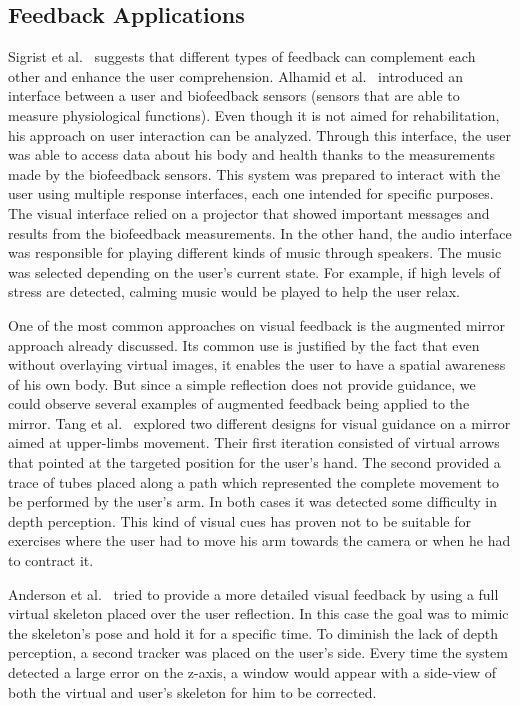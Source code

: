 \subsection{Feedback Applications}



Sigrist et al.~\cite{Sigrist2013} suggests that different types of feedback can complement each other and enhance the user comprehension. 
Alhamid et al.~\cite{Alhamid2012a} introduced an interface between a user and biofeedback sensors (sensors that are able to measure physiological functions). 
Even though it is not aimed for rehabilitation, his approach on user interaction can be analyzed.
Through this interface, the user was able to access data about his body and health thanks to the measurements made by the biofeedback sensors.
This system was prepared to interact with the user using multiple response interfaces, each one intended for specific purposes.
The visual interface relied on a projector that showed important messages and results from the biofeedback measurements.
In the other hand, the audio interface was responsible for playing different kinds of music through speakers. 
The music was selected depending on the user's current state. For example, if high levels of stress are detected,  calming music would be played to help the user relax.

One of the most common approaches on visual feedback is the augmented mirror approach already discussed. 
Its common use is justified by the fact that even without overlaying virtual images, it enables the user to have a spatial awareness of his own body.
But since a simple reflection does not provide guidance, we could observe several examples of augmented feedback being applied to the mirror.
Tang et al.~\cite{Tang2014a} explored two different designs for visual guidance on a mirror aimed at upper-limbs movement.
Their first iteration consisted of virtual arrows that pointed at the targeted position for the user's hand.
The second provided a trace of tubes placed along a path which represented the complete movement to be performed by the user's arm.
In both cases it was detected some difficulty in depth perception. 
This kind of visual cues has proven not to be suitable for exercises 
where the user had to move his arm towards the camera or when he had to contract it.

Anderson et al.~\cite{Anderson} tried to provide a more detailed visual feedback 
by using a full virtual skeleton placed over the user reflection. In this case the goal 
was to mimic the skeleton's pose and hold it for a specific time.
To diminish the lack of depth perception, a second tracker was placed on the user's side. 
Every time the system detected a large error on the z-axis, a window would appear with a 
side-view of both the virtual and user's skeleton for him to be corrected.

